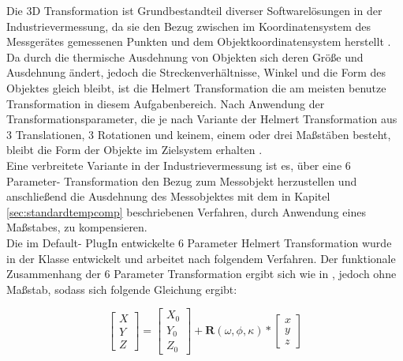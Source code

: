 Die 3D Transformation ist Grundbestandteil diverser Softwarelösungen in der Industrievermessung, da sie den Bezug zwischen im Koordinatensystem des Messgerätes gemessenen Punkten und dem Objektkoordinatensystem herstellt \cite{Drixler1993}. Da durch die thermische Ausdehnung von Objekten sich deren Größe und Ausdehnung ändert, jedoch die Streckenverhältnisse, Winkel und die Form des Objektes gleich bleibt, ist die Helmert Transformation die am meisten benutze Transformation in diesem Aufgabenbereich. Nach Anwendung der Transformationsparameter, die je nach Variante der Helmert Transformation aus 3 Translationen, 3 Rotationen und keinem, einem oder drei Maßstäben besteht, bleibt die Form der Objekte im Zielsystem erhalten \cite{Carosio2006}.\\
Eine verbreitete Variante in der Industrievermessung ist es, über eine 6 Parameter- Transformation den Bezug zum Messobjekt herzustellen und anschließend die Ausdehnung des Messobjektes mit dem in Kapitel \ref{sec:standardtempcomp} beschriebenen Verfahren, durch Anwendung eines Maßstabes, zu kompensieren.\\
Die im Default- PlugIn entwickelte 6 Parameter Helmert Transformation wurde in der Klasse  entwickelt und arbeitet nach folgendem Verfahren.
Der funktionale Zusammenhang der 6 Parameter Transformation ergibt sich wie in \cite{Niemeier2008}, jedoch ohne Maßstab, sodass sich folgende Gleichung ergibt:

\begin{equation}
\begin{bmatrix} X \\ Y \\ Z \end{bmatrix} = \begin{bmatrix} X_{0} \\ Y_{0} \\ Z_{0} \end{bmatrix} + \textbf{R}(\omega,\phi,\kappa) * \begin{bmatrix} x \\ y \\ z \end{bmatrix}
\end{equation}

